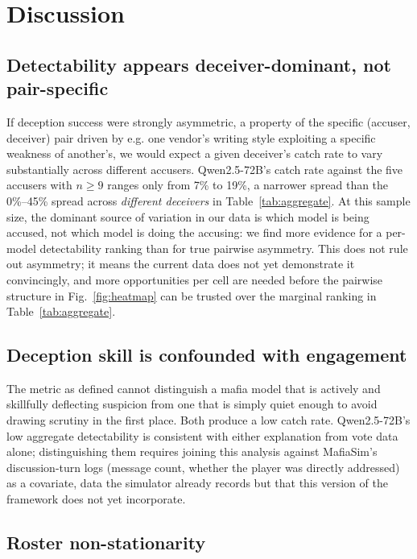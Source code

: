 \documentclass[10pt,conference]{IEEEtran}
\begin{document}
\section{Discussion}

\subsection{Detectability appears deceiver-dominant, not pair-specific}

If deception success were strongly asymmetric, a property of the specific (accuser, deceiver) pair driven by e.g. one vendor's writing style exploiting a specific weakness of another's, we would expect a given deceiver's catch rate to vary substantially across different accusers. Qwen2.5-72B's catch rate against the five accusers with $n{\geq}9$ ranges only from 7\% to 19\%, a narrower spread than the 0\%--45\% spread across \textit{different deceivers} in Table~\ref{tab:aggregate}. At this sample size, the dominant source of variation in our data is which model is being accused, not which model is doing the accusing: we find more evidence for a per-model detectability ranking than for true pairwise asymmetry. This does not rule out asymmetry; it means the current data does not yet demonstrate it convincingly, and more opportunities per cell are needed before the pairwise structure in Fig.~\ref{fig:heatmap} can be trusted over the marginal ranking in Table~\ref{tab:aggregate}.

\subsection{Deception skill is confounded with engagement}

The metric as defined cannot distinguish a mafia model that is actively and skillfully deflecting suspicion from one that is simply quiet enough to avoid drawing scrutiny in the first place. Both produce a low catch rate. Qwen2.5-72B's low aggregate detectability is consistent with either explanation from vote data alone; distinguishing them requires joining this analysis against MafiaSim's discussion-turn logs (message count, whether the player was directly addressed) as a covariate, data the simulator already records but that this version of the framework does not yet incorporate.

\subsection{Roster non-stationarity}
\end{document}
